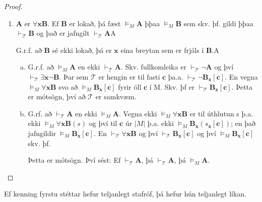 \documentclass[12pt]{book}
\begin{document}
\begin{setn}
\begin{proof}
\begin{enumerate}[(1)]
    \item $\mathbf{A}$ er $\forall \mathbf{x} \mathbf{B}$. Ef
      $\mathbf{B}$ er lokað, þá fæst $\models_M \mathbf{A}$ þþaa $\models_M \mathbf{B}$ sem skv.
      þf. gildi þþaa $\vdash_{\mathcal{T}} \mathbf{B}$ og það er jafngilt $\vdash_{\mathcal{T}} \mathbf{A}$A

      G.r.f. að $\mathbf{B}$ sé ekki lokað, þá er $\mathbf{x}$ eina breytan sem er frjáls í $\mathbf{B}$.A

      \begin{enumerate}[(a)]
      \item  G.r.f. að $\models_M \mathbf{A}$ en  ekki $\vdash_{\mathcal{T}} \mathbf{A}$.
        Skv. fullkomleika er $\vdash_{\mathcal{T}} \lnot \mathbf{A}$ og því
        $\vdash_{\mathcal{T}} \exists \mathbf{x} \lnot \mathbf{B}$. Þar sem
        $\mathcal{T}$ er hengin er til fasti $\mathbf{c}$ þa.a. 
        $\vdash_{\mathcal{T}} \lnot \mathbf{B}_{\mathbf{x}} [\mathbf{c}]$.
        En vegna $\models_M \forall \mathbf{x} \mathbf{B}$ svo að
        $\models_M \mathbf{B}_{\mathbf{x}} [\mathbf{c}]$ fyrir öll
        $\mathbf{c}$ í M.
        Skv. þf er $\vdash_{\mathcal{T}} \mathbf{B}_{\mathbf{x}} [\mathbf{c}]$. 
        Þetta er mótsögn, því að $\mathcal{T}$ er samkvæm.
      \item  G.rf. að $\vdash_{\mathcal{T}} \mathbf{A}$ en ekki $\models_M \mathbf{A}$.
        Vegna ekki $\models_M \forall \mathbf{x} \mathbf{B}$ er til úthlutun s
        þ.a. ekki $\models_M \forall \mathbf{x} \mathbf{B} (s)$ og því til $\mathbf{c}$ úr
        $|M|$ þ.a. ekki $\models_M \mathbf{B}_{\mathbf{x}} ( s_{\mathbf{x}}[\mathbf{c}])$;
        en það jafngildir $\models_M \mathbf{B}_{\mathbf{x}}[\mathbf{c}]$. En 
        $\vdash_{\mathcal{T}} \forall \mathbf{x} \mathbf{B}$ og því
        $\vdash_{\mathcal{T}} \mathbf{B}_{\mathbf{x}} [\mathbf{c}]$ og því
        $\models_M \mathbf{B}_{\mathbf{x}} [\mathbf{c}]$ skv. þf. 

        Þetta er mótsögn. Því sést:
        Ef $\vdash_{\mathcal{T}} \mathbf{A}$, þá $\vdash_{\mathcal{T}} \mathbf{A}$,
        þá $\models_M \mathbf{A}$.
      \end{enumerate}
    \end{enumerate}
    \end{proof}
\end{setn}

\begin{setn}
Ef kenning fyrstu stéttar hefur teljanlegt stafróf,
þá hefur hún teljanlegt líkan.
\end{setn}
\end{document}

